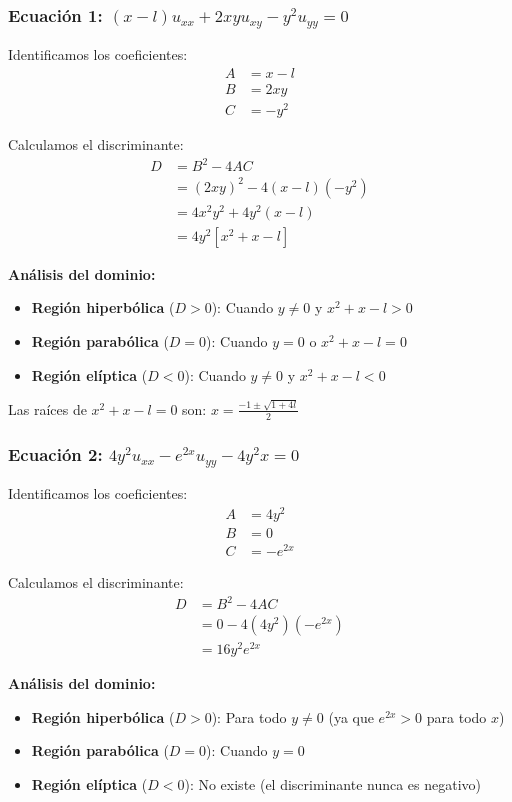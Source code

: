 \documentclass[a4paper]{article}
\begin{document}
\subsubsection{Ecuación 1: $(x - l)u_{xx} + 2xyu_{xy} - y^2u_{yy} = 0$}

Identificamos los coeficientes:
\begin{align}
A &= x - l \\
B &= 2xy \\
C &= -y^2
\end{align}

Calculamos el discriminante:
\begin{align}
D &= B^2 - 4AC \\
&= (2xy)^2 - 4(x-l)(-y^2) \\
&= 4x^2y^2 + 4y^2(x-l) \\
&= 4y^2[x^2 + x - l]
\end{align}

\textbf{Análisis del dominio:}
\begin{itemize}
    \item \textbf{Región hiperbólica} ($D > 0$): Cuando $y \neq 0$ y $x^2 + x - l > 0$
    \item \textbf{Región parabólica} ($D = 0$): Cuando $y = 0$ o $x^2 + x - l = 0$
    \item \textbf{Región elíptica} ($D < 0$): Cuando $y \neq 0$ y $x^2 + x - l < 0$
\end{itemize}

Las raíces de $x^2 + x - l = 0$ son: $x = \frac{-1 \pm \sqrt{1 + 4l}}{2}$

\subsubsection{Ecuación 2: $4y^2u_{xx} - e^{2x}u_{yy} - 4y^2x = 0$}

Identificamos los coeficientes:
\begin{align}
A &= 4y^2 \\
B &= 0 \\
C &= -e^{2x}
\end{align}

Calculamos el discriminante:
\begin{align}
D &= B^2 - 4AC \\
&= 0 - 4(4y^2)(-e^{2x}) \\
&= 16y^2e^{2x}
\end{align}

\textbf{Análisis del dominio:}
\begin{itemize}
    \item \textbf{Región hiperbólica} ($D > 0$): Para todo $y \neq 0$ (ya que $e^{2x} > 0$ para todo $x$)
    \item \textbf{Región parabólica} ($D = 0$): Cuando $y = 0$
    \item \textbf{Región elíptica} ($D < 0$): No existe (el discriminante nunca es negativo)
\end{itemize}
\end{document}
